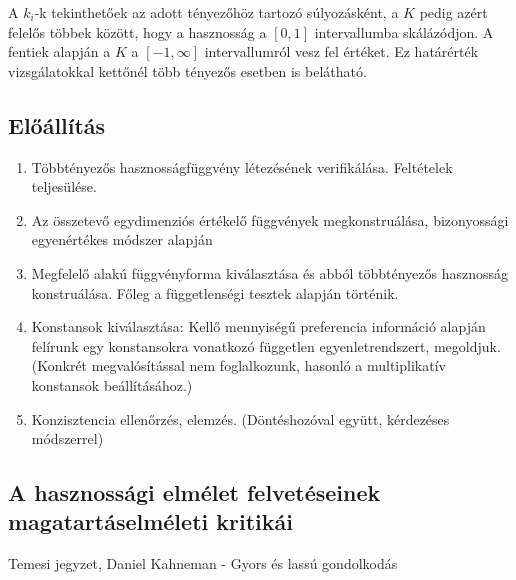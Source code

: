 \documentclass[a4paper,12pt]{article}
\begin{document}
A $k_i$-k tekinthetőek az adott tényezőhöz tartozó súlyozásként, a $K$ pedig azért felelős többek között, hogy a hasznosság a $[0,1]$ intervallumba skálázódjon. A fentiek alapján a $K$ a $[-1, \infty]$ intervallumról vesz fel értéket. Ez határérték vizsgálatokkal kettőnél több tényezős esetben is belátható.


\subsection{Előállítás}

\begin{enumerate}
\item Többtényezős hasznosságfüggvény létezésének verifikálása. Feltételek teljesülése.
\item Az összetevő egydimenziós értékelő függvények megkonstruálása, bizonyossági egyenértékes módszer alapján
\item Megfelelő alakú függvényforma kiválasztása és abból többtényezős hasznosság konstruálása. Főleg a függetlenségi tesztek alapján történik.
\item Konstansok kiválasztása: Kellő mennyiségű preferencia információ alapján felírunk egy konstansokra vonatkozó független egyenletrendszert, megoldjuk. (Konkrét megvalósítással nem foglalkozunk, hasonló a multiplikatív konstansok beállításához.)
\item Konzisztencia ellenőrzés, elemzés. (Döntéshozóval együtt, kérdezéses módszerrel)
\end{enumerate}

\subsection{A hasznossági elmélet felvetéseinek magatartáselméleti kritikái}

Temesi jegyzet, Daniel Kahneman - Gyors és lassú gondolkodás

\end{document}
